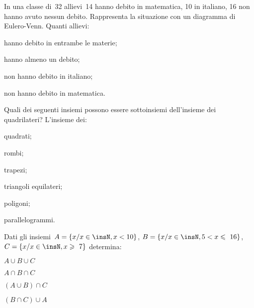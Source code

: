 \begin{esercizio}
\label{ese:7.83}
In una classe di~32 allievi~14 hanno debito in matematica, 10 in
italiano, 16 non hanno avuto nessun debito. Rappresenta la situazione
con un diagramma di Eulero-Venn. Quanti allievi:
\vspace{-6pt}
\begin{multicols}{2}
\begin{enumeratea}
\item hanno debito in entrambe le materie;
\item hanno almeno un debito;
\item non hanno debito in italiano;
\item non hanno debito in matematica.
\end{enumeratea}
\end{multicols}
\vspace{-12pt}
\end{esercizio}

\begin{esercizio}
\label{ese:7.84}
Quali dei seguenti insiemi possono essere sottoinsiemi dell'insieme dei 
quadrilateri?
L'insieme dei:
\vspace*{-12pt}
\begin{multicols}{3}
\begin{enumeratea}
 \item quadrati;
 \item rombi;
 \item trapezi;
 \item triangoli equilateri;
 \item poligoni;
 \item parallelogrammi.
\end{enumeratea}
\end{multicols}
\vspace{-12pt}
\end{esercizio}

\begin{esercizio}
\label{ese:7.85}
Dati gli insiemi~$A=\{x/x\in\insN,x<10\}$, $B=\{x/x\in\insN,5<x\leqslant~16\}$,
$C=\{x/x\in \insN,x\geqslant~7\}$ determina:
\begin{multicols}{4}
\begin{enumeratea}
\item $A\cup B\cup C$
\item $A\cap B\cap C$
\item $(A\cup B)\cap C$
\item $(B\cap C)\cup A$
\end{enumeratea}
\end{multicols}
\end{esercizio}


